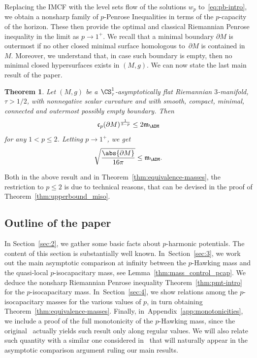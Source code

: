 \documentclass[10pt,a4paper]{amsart}
\numberwithin{equation}{section}
\newtheorem{Theorem}{Theorem}[section]
\newcounter{case}
\renewcommand{\ncapa}{\mathfrak{c}}
\newcommand{\ma}{\mathfrak{m}}
\begin{document}
Replacing the IMCF with the level sets flow of the solutions $w_p$ to~\eqref{eq:pb-intro}, we obtain a nonsharp family of $p$-Penrose Inequalities in terms of the $p$-capacity of the horizon. These then provide the optimal and classical Riemannian Penrose inequality in the limit as $p \to 1^+$. We recall that a minimal boundary $\partial M$ is outermost if no other closed minimal surface homologous to~$\partial M$ is contained in $M$. Moreover, we understand that, in case such boundary is empty, then no minimal closed hypersurfaces exists in $(M, g)$. We can now state the last main result of the paper.
\begin{Theorem}
\label{thm:penroseadmintro}
 Let $(M,g)$ be a $\CS^1_\tau$-asymptotically flat Riemannian $3$-manifold, $\tau >1/2$, with nonnegative scalar curvature and with smooth, compact, minimal, connected and outermost possibly empty boundary. Then
\begin{equation}
\label{eq:p-penroseintro}
 \ncapa_p(\partial M)^{\frac{1}{3-p}}\leq 2 \ma_{\ADM}
\end{equation}
for any $1< p \leq 2$. Letting $p\to 1^+$, we get
\begin{equation}
\label{eq:penroseintro}
 \sqrt{\frac{\abs{ \partial M}}{16 \pi}} \leq \ma_{\ADM}.
\end{equation}
\end{Theorem}
Both in the above result and in Theorem~\ref{thm:equivalence-masses}, the restriction to $p\leq 2$ is due to technical reasons, that can be devised in the proof of Theorem~\ref{thm:upperbound_miso}.
\subsection*{Outline of the paper}In Section~\ref{sec:2}, we gather some basic facts about $p$-harmonic potentials. The content of this section is substantially well known. In~Section~\ref{sec:3}, we work out the main asymptotic comparison at infinity between the $p$-Hawking mass and the quasi-local $p$-isocapacitary mass, see Lemma~\ref{thm:mass_control_pcap}. We deduce the nonsharp Riemannian Penrose inequality Theorem~\ref{thm:pmt-intro} for the $p$-isocapacitary mass. In~Section~\ref{sec:4}, we show relations among the $p$-isocapacitary masses for the various values of $p$, in turn obtaining Theorem~\ref{thm:equivalence-masses}. Finally, in~Appendix~\ref{app:monotonicities}, we include a proof of the full monotonicity of the $p$-Hawking mass, since the original~\cite[Theorem~1.1]{agostiniani_riemannianpenroseinequalitynonlinear_2022} actually yields such result only along regular values. We will also relate such quantity with a similar one considered in~\cite{chan_monotonicitygreenfunctions_2022} that will naturally appear in the asymptotic comparison argument ruling our main results.
\end{document}
